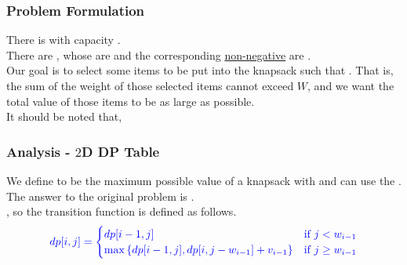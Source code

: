 \subsubsection{Problem Formulation}
There is {\color{blue}{a knapsack}} with capacity {\color{blue}{$W$}}. \\

There are {\color{blue}{$n$ types of items}}, whose {\color{blue}{weights}} are {} and the corresponding \ul{non-negative} {\color{blue}{values}} are {}. \\

Our goal is to select some items to be put into the knapsack such that {\color{blue}{the total value of those items is maximized}}. That is, the sum of the weight of those selected items cannot exceed $W$, and we want the total value of those items to be as large as possible.\\

It should be noted that, {\color{blue}{in the unbounded knapsack problem, you can use each type of item as many times as needed.}}

\subsubsection{Analysis - $2$D DP Table}
We define {\color{blue}{$ dp[i, j] $}} to be the maximum possible value of a knapsack with {\color{blue}{capacity $ j $}} and can use the {\color{blue}{first $ i $ types of items}}. \\

The answer to the original problem is {\color{blue}{$ dp[n, W] $}}.\\

{\color{ForestGreen}{For each item $i$, we can choose to either put it into the knapsack or not}}, so the transition function is defined as follows.
\begin{equation}
{\color{blue}{
dp[i, j] = 
\begin{cases} 
    dp[i - 1, j] & \text{if}\ j < w_{i-1}\\
    \max\left\{dp[i - 1, j], dp[i, j - w_{i-1}] + v_{i-1}\right\} & \text{if}\ j \geq w_{i-1}
\end{cases}
}}
\end{equation}

